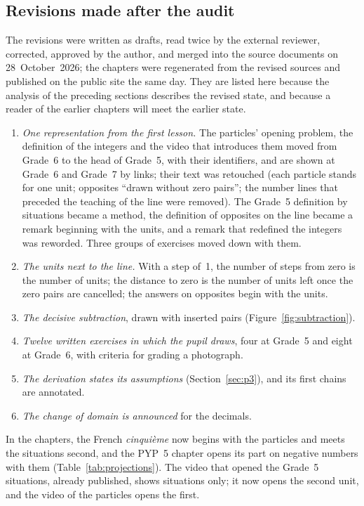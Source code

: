 \documentclass[11pt,a4paper]{article}
\theoremstyle{definition}
\begin{document}
\subsection{Revisions made after the audit}\label{sec:revisions}
The revisions were written as drafts, read twice by the external reviewer, corrected, approved by the author, and merged into the source documents on 28~October~2026; the chapters were regenerated from the revised sources and published on the public site the same day. They are listed here because the analysis of the preceding sections describes the revised state, and because a reader of the earlier chapters will meet the earlier state.
\begin{enumerate}[leftmargin=*]
\item \emph{One representation from the first lesson.} The particles' opening problem, the definition of the integers and the video that introduces them moved from Grade~6 to the head of Grade~5, with their identifiers, and are shown at Grade~6 and Grade~7 by links; their text was retouched (each particle stands for one unit; opposites ``drawn without zero pairs''; the number lines that preceded the teaching of the line were removed). The Grade~5 definition by situations became a method, the definition of opposites on the line became a remark beginning with the units, and a remark that redefined the integers was reworded. Three groups of exercises moved down with them.
\item \emph{The units next to the line.} With a step of~1, the number of steps from zero is the number of units; the distance to zero is the number of units left once the zero pairs are cancelled; the answers on opposites begin with the units.
\item \emph{The decisive subtraction}, drawn with inserted pairs (Figure~\ref{fig:subtraction}).
\item \emph{Twelve written exercises in which the pupil draws}, four at Grade~5 and eight at Grade~6, with criteria for grading a photograph.
\item \emph{The derivation states its assumptions} (Section~\ref{sec:p3}), and its first chains are annotated.
\item \emph{The change of domain is announced} for the decimals.
\end{enumerate}
In the chapters, the French \emph{cinqui\`eme} now begins with the particles and meets the situations second, and the PYP~5 chapter opens its part on negative numbers with them (Table~\ref{tab:projections}). The video that opened the Grade~5 situations, already published, shows situations only; it now opens the second unit, and the video of the particles opens the first.
\end{document}
